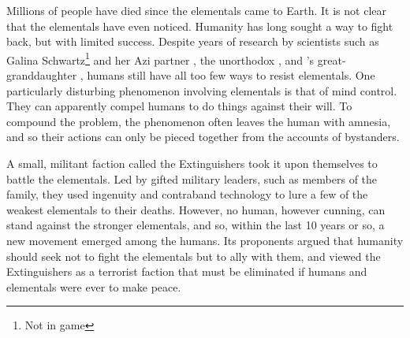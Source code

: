 \documentclass[blue]{elementals}
\begin{document}

Millions of people have died since the elementals came to Earth. It is not clear that the elementals have even noticed. Humanity has long sought a way to fight back, but with limited success. Despite years of research by scientists such as Galina Schwartz\footnote{Not in game} and her Azi partner \cScientist{\full}, the unorthodox \cMS{\full}, and \cGrandfather{\full}'s great-granddaughter \cGD{}, humans still have all too few ways to resist elementals.  One particularly disturbing phenomenon involving elementals is that of mind control.  They can apparently compel humans to do things against their will. To compound the problem, the phenomenon often leaves the human with amnesia, and so their actions can only be pieced together from the accounts of bystanders.


A small, militant faction called the Extinguishers took it upon themselves to battle the elementals.  Led by gifted military leaders, such as members of the \cDema{\formal} family, they used ingenuity and contraband technology to lure a few of the weakest elementals to their deaths.  However, no human, however cunning, can stand against the stronger elementals, and so, within the last 10 years or so, a new movement emerged among the humans. Its proponents argued that humanity should seek not to fight the elementals but to ally with them, and viewed the Extinguishers as a terrorist faction that must be eliminated if humans and elementals were ever to make peace.
\end{document}
